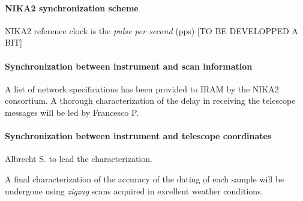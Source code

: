\paragraph{NIKA2 synchronization scheme}
NIKA2 reference clock is the \emph{pulse per second} (pps)  [TO BE DEVELOPPED A BIT]

\paragraph{Synchronization between instrument and scan information}
A list of network specifications has been provided to IRAM by the NIKA2 consortium. A thorough characterization of the delay in receiving the telescope messages will be led by Francesco P.

\paragraph{Synchronization between instrument and telescope coordinates}
Albrecht S. to lead the characterization.

A final characterization of the accuracy of the dating of each sample will be undergone using \emph{zigzag} scans acquired in excellent weather conditions. 


